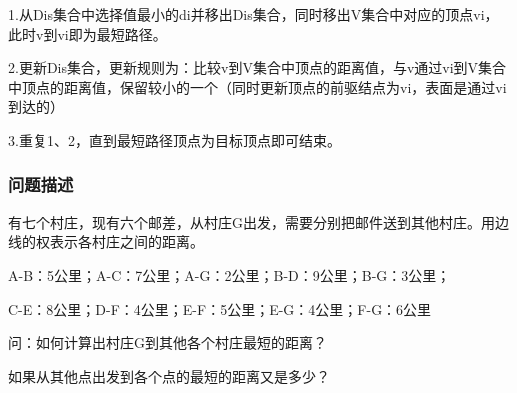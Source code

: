 \documentclass[a4paper]{report}
\begin{document}
1.从Dis集合中选择值最小的di并移出Dis集合，同时移出V集合中对应的顶点vi，此时v到vi即为最短路径。

2.更新Dis集合，更新规则为：比较v到V集合中顶点的距离值，与v通过vi到V集合中顶点的距离值，保留较小的一个（同时更新顶点的前驱结点为vi，表面是通过vi到达的）

3.重复1、2，直到最短路径顶点为目标顶点即可结束。
\subsubsection{问题描述}
有七个村庄，现有六个邮差，从村庄G出发，需要分别把邮件送到其他村庄。用边线的权表示各村庄之间的距离。

A-B：5公里；A-C：7公里；A-G：2公里；B-D：9公里；B-G：3公里；

C-E：8公里；D-F：4公里；E-F：5公里；E-G：4公里；F-G：6公里

问：如何计算出村庄G到其他各个村庄最短的距离？

如果从其他点出发到各个点的最短的距离又是多少？
\end{document}
